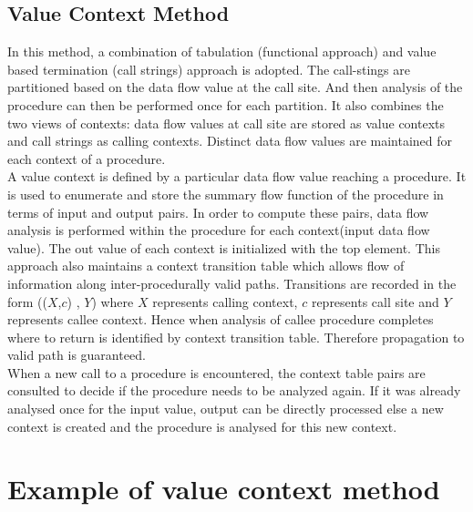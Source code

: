 \subsection{Value Context Method}

In this method, a combination of tabulation (functional approach) and value based termination (call strings) approach is adopted. The call-stings are partitioned based on the data flow value at the call site. And then analysis of the procedure can then be performed once for each partition. It also combines the two views of contexts: data flow values at call site are stored as value contexts and call strings as calling contexts. Distinct data flow values are maintained for each context of a procedure.\cite{vasco} \\

A value context is defined by a particular data flow value reaching a procedure. It is used to enumerate and store the summary flow function of the procedure in terms of input and output pairs. In order to compute these pairs, data flow analysis is performed within the procedure for each context(input data flow value). The out value of each context is  initialized with the top element. This approach also maintains a context transition table which allows flow of information along inter-procedurally valid paths. Transitions are recorded in the form (($X$,$c$) , $Y$) where $X$
represents calling context, $c$ represents call site and $Y$ represents callee context. Hence when analysis of callee procedure completes where to return is
identified by context transition table. Therefore propagation to valid path is guaranteed. \\

When a new call to a procedure is encountered, the context table pairs are consulted to decide if the procedure needs to be analyzed again. If it was already analysed once for the input value, output can be directly processed else a new context is created and the procedure is analysed for
this new context.

\section{Example of value context method}

